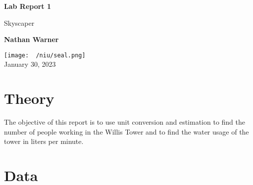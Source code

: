 \documentclass{report}
\title{\Huge{}}
\author{\huge{Nathan Warner}}
\date{\huge{}}
\begin{document}
        \begin{titlepage}
       \begin{center}
           \vspace*{1cm}
    
           \textbf{Lab Report 1}
    
           \vspace{0.5cm}
            Skyscaper
                
           \vspace{1.5cm}
    
           \textbf{Nathan Warner}
    
           \vfill
                
                
           \vspace{0.8cm}
         
           \texttt{[image: ~/niu/seal.png]} \\
           January 30, 2023
           
                
       \end{center}
    \end{titlepage}
    \tableofcontents
    \pagebreak 
    \section{Theory}
    \bigbreak \noindent 
    The objective of this report is to use unit conversion and estimation to find the number of people working in the Willis Tower and to find the water usage of the tower in liters per minute.

    \bigbreak \noindent 
    \section{Data}

    \pagebreak 
\end{document}
